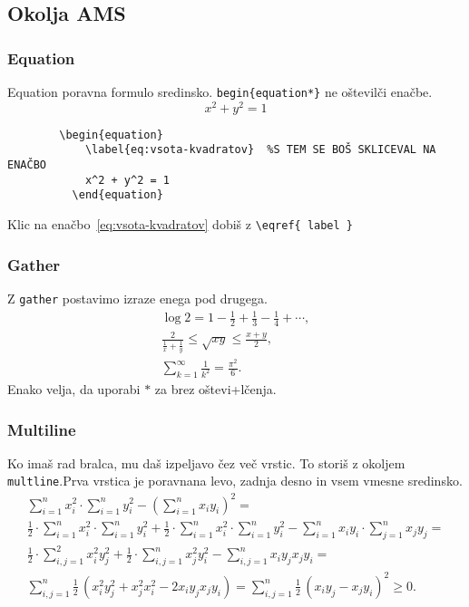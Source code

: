\documentclass[a4paper, 12pt]{article}
\newcommand{\tx}{\hspace*{0pt}\hfill\verb}
\begin{document}
    \subsection{Okolja AMS}
    \subsubsection{Equation}
    Equation poravna formulo sredinsko. \verb|begin{equation*}| ne oštevilči enačbe.
    \begin{equation}
        \label{eq:vsota-kvadratov}
        x^2 + y^2 = 1
      \end{equation}
    \begin{verbatim}
        \begin{equation}
            \label{eq:vsota-kvadratov}  %S TEM SE BOŠ SKLICEVAL NA ENAČBO
            x^2 + y^2 = 1
          \end{equation}
    \end{verbatim}
    Klic na enačbo~\eqref{eq:vsota-kvadratov} dobiš z \tx|\eqref{ label }|
    \subsubsection{Gather}
    Z \texttt{gather} postavimo izraze enega pod drugega.
    \begin{gather}
        \log 2 = 1 - \frac{1}{2} + \frac{1}{3} - \frac{1}{4} + \cdots, \\
        \frac{2}{\frac{1}{x} + \frac{1}{y}} \leq \sqrt{x y} \leq \frac{x + y}{2}, \\
        \sum_{k = 1}^\infty \frac{1}{k^2} = \frac{\pi^2}{6}.
      \end{gather}
      Enako velja, da uporabi $*$ za brez oštevi+lčenja.
      \subsubsection{Multiline}
      Ko imaš rad bralca, mu daš izpeljavo čez več vrstic. To storiš z okoljem \texttt{multline}.Prva vrstica je
      poravnana levo, zadnja desno in vsem vmesne sredinsko.
      \begin{multline*}
        \sum_{i=1}^n x_i^2 \cdot \sum_{i=1}^n y_i^2
        - \left( \sum_{i=1}^n x_i y_i \right)^2 = \\
        \frac{1}{2} \cdot \sum_{i=1}^n x_i^2 \cdot \sum_{i=1}^n y_i^2
        +
        \frac{1}{2} \cdot \sum_{i=1}^n x_i^2 \cdot \sum_{i=1}^n y_i^2
        -
        \sum_{i=1}^n x_i y_i \cdot \sum_{j=1}^n x_j y_j = \\
        \frac{1}{2} \cdot \sum_{i,j=1}^2 x_i^2 y_j^2
        +
        \frac{1}{2} \cdot \sum_{i,j=1}^n x_j^2 y_i^2
        -
        \sum_{i,j=1}^n x_i y_j x_j y_i = \\
        \sum_{i,j=1}^n \frac{1}{2}\,
        \left(
          x_i^2 y_j^2 + x_j^2 x_i^2 - 2 x_i y_j x_j y_i
        \right)
        =
        \sum_{i,j=1}^n \frac{1}{2}\,
        \left(
          x_i y_j - x_j y_i
        \right)^2
        \geq 0.
      \end{multline*}
\end{document}
